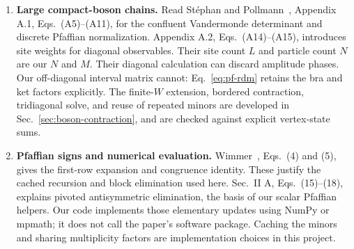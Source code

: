 \begin{enumerate}
$\langle a_ra_s\rangle=\delta_{rs}-iG_{rs}$, whereas the review writes
$\delta_{rs}+i\Gamma_{rs}$ and chooses a different sign for one Majorana
per site. After aligning the basis, $G=-\Gamma$.
The Gaussian statement applies to each Ising primary; the mixture in
Eq.~\eqref{eq:large-target} is evaluated as a full matrix.
\item \textbf{Large compact-boson chains.}
Read St\'{e}phan and Pollmann~\cite{Stephan}, Appendix A.1,
Eqs.~(A5)--(A11), for the confluent Vandermonde determinant and
discrete Pfaffian normalization. Appendix A.2, Eqs.~(A14)--(A15),
introduces site weights for diagonal observables. Their site count $L$
and particle count $N$ are our $N$ and $M$. Their diagonal calculation
can discard amplitude phases. Our off-diagonal interval matrix cannot:
Eq.~\eqref{eq:pf-rdm} retains the bra and ket factors explicitly.
The finite-$W$ extension, bordered contraction, tridiagonal solve,
and reuse of repeated minors are developed in Sec.~\ref{sec:boson-contraction}, and are
checked against explicit vertex-state sums.
\item \textbf{Pfaffian signs and numerical evaluation.}
Wimmer~\cite{Wimmer}, Eqs.~(4) and (5), gives the first-row expansion
and congruence identity. These justify the cached recursion and block
elimination used here. Sec.~II A, Eqs.~(15)--(18), explains pivoted
antisymmetric elimination, the basis of our scalar Pfaffian helpers.
Our code implements those elementary updates using NumPy or mpmath;
it does not call the paper's software package. Caching the minors and
sharing multiplicity factors are implementation choices in this project.
\end{enumerate}


